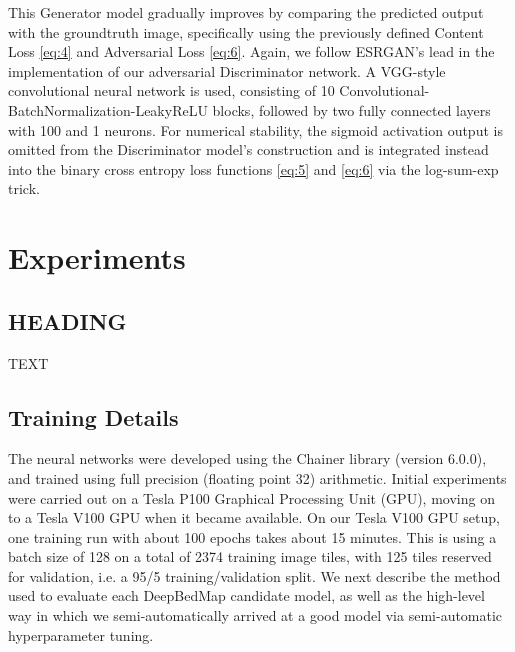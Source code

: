 \documentclass[tc, manuscript]{copernicus}
\begin{document}
This Generator model gradually improves by comparing the predicted output with the groundtruth image, specifically using the previously defined Content Loss \eqref{eq:4} and Adversarial Loss \eqref{eq:6}.
Again, we follow ESRGAN's lead in the implementation of our adversarial Discriminator network.
A VGG-style convolutional neural network \citep{SimonyanVeryDeepConvolutional2014} is used, consisting of 10 Convolutional-BatchNormalization-LeakyReLU blocks, followed by two fully connected layers with 100 and 1 neurons.
For numerical stability, the sigmoid activation output is omitted from the Discriminator model's construction and is integrated instead into the binary cross entropy loss functions \eqref{eq:5} and \eqref{eq:6} via the log-sum-exp trick.

\section{Experiments}

\subsection{HEADING}
TEXT

\subsection{Training Details}

The neural networks were developed using the Chainer library (version 6.0.0), and trained using full precision (floating point 32) arithmetic.
Initial experiments were carried out on a Tesla P100 Graphical Processing Unit (GPU), moving on to a Tesla V100 GPU when it became available.
On our Tesla V100 GPU setup, one training run with about 100 epochs takes about 15 minutes.
This is using a batch size of 128 on a total of 2374 training image tiles, with 125 tiles reserved for validation, i.e. a 95/5 training/validation split.
We next describe the method used to evaluate each DeepBedMap candidate model, as well as the high-level way in which we semi-automatically arrived at a good model via semi-automatic hyperparameter tuning.
\end{document}
